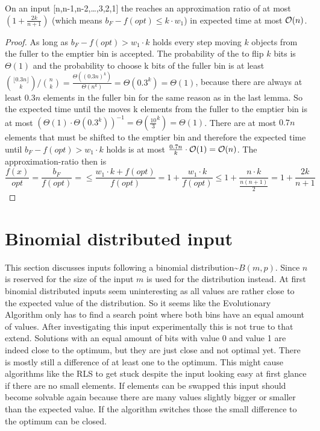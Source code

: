 \begin{lemma}
    On an input [n,n-1,n-2,\dots,3,2,1] the \RLSN[k] reaches an approximation ratio of at most $(1+\frac{2k}{n+1})$ (which means $b_F-f(opt)\le k\cdot w_1$) in expected time at most $\mathcal{O}(n)$.
\end{lemma}
\begin{proof}
    As long as $b_F-f(opt)>w_1\cdot k$ holds every step moving $k$ objects from the fuller to the emptier bin is accepted.
    The probability of the \RLSN[k] to flip $k$ bits is $\Theta(1)$ and the probability to choose k bits of the fuller bin is at least \(\binom{\lfloor 0.3n\rfloor}{k}/\binom{n}{k}=\frac{\Theta({(0.3n)}^k)}{\Theta(n^k)}=\Theta(0.3^k)=\Theta(1)\), because there are always at least $0.3n$ elements in the fuller bin for the same reason as in the last lemma.
    So the expected time until the \RLSN[k] moves k elements from the fuller to the emptier bin is at most \({(\Theta(1)\cdot\Theta(0.3^k))}^{-1}=\Theta({\frac{10}{3}}^k)=\Theta(1)\).
    There are at most $0.7n$ elements that must be shifted to the emptier bin and therefore the expected time until $b_F-f(opt)>w_1\cdot k$ holds is at most $\frac{0.7n}{k}\cdot\mathcal{O}(1)=\mathcal{O}(n)$.
    The approximation-ratio then is
    \[
        \frac{f(x)}{opt}
        =\frac{b_F}{f(opt)}
        =\le\frac{w_1\cdot k+f(opt)}{f(opt)}
        =1+\frac{w_1\cdot k}{f(opt)}
        \le1+\frac{n\cdot k}{\frac{n(n+1)}{2}}
        =1+\frac{2k}{n+1}
    \]
\end{proof}

\section{Binomial distributed input}
This section discusses inputs following a binomial distribution\textasciitilde$B(m,p)$.
Since $n$ is reserved for the size of the input $m$ is used for the distribution instead.
At first binomial distributed inputs seem uninteresting as all values are rather close to the expected value of the distribution.
So it seems like the Evolutionary Algorithm only has to find a search point where both bins have an equal amount of values.
After investigating this input experimentally this is not true to that extend.
Solutions with an equal amount of bits with value 0 and value 1 are indeed close to the optimum, but they are just close and not optimal yet.
There is mostly still a difference of at least one to the optimum.
This might cause algorithms like the RLS to get stuck despite the input looking easy at first glance if there are no small elements.
If elements can be swapped this input should become solvable again because there are many values slightly bigger or smaller than the expected value.
If the algorithm switches those the small difference to the optimum can be closed.

